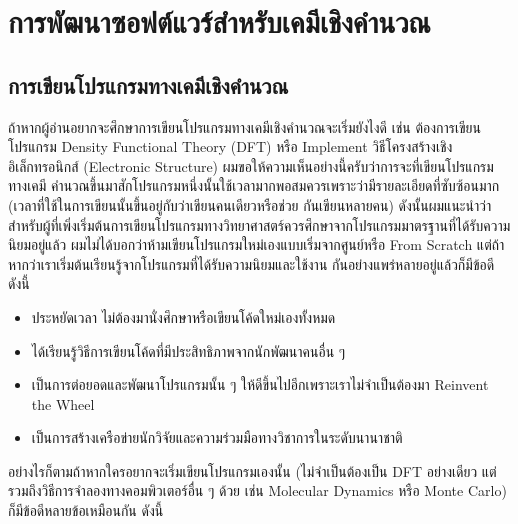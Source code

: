 

\chapter{การพัฒนาซอฟต์แวร์สำหรับเคมีเชิงคำนวณ}
\label{ch:software_dev}

\section{การเขียนโปรแกรมทางเคมีเชิงคำนวณ}

ถ้าหากผู้อ่านอยากจะศึกษาการเขียนโปรแกรมทางเคมีเชิงคำนวณจะเริ่มยังไงดี เช่น ต้องการเขียนโปรแกรม Density Functional Theory (DFT)
หรือ Implement วิธีโครงสร้างเชิงอิเล็กทรอนิกส์ (Electronic Structure) ผมขอให้ความเห็นอย่างนี้ครับว่าการจะที่เขียนโปรแกรมทางเคมี%
คำนวณขึ้นมาสักโปรแกรมหนึ่งนั้นใช้เวลามากพอสมควรเพราะว่ามีรายละเอียดที่ซับซ้อนมาก (เวลาที่ใช้ในการเขียนนั้นขึ้นอยู่กับว่าเขียนคนเดียวหรือช่วย%
กันเขียนหลายคน) ดังนั้นผมแนะนำว่าสำหรับผู้ที่เพิ่งเริ่มต้นการเขียนโปรแกรมทางวิทยาศาสตร์ควรศึกษาจากโปรแกรมมาตรฐานที่ได้รับความนิยมอยู่แล้ว
ผมไม่ได้บอกว่าห้ามเขียนโปรแกรมใหม่เองแบบเริ่มจากศูนย์หรือ From Scratch แต่ถ้าหากว่าเราเริ่มต้นเรียนรู้จากโปรแกรมที่ได้รับความนิยมและใช้งาน%
กันอย่างแพร่หลายอยู่แล้วก็มีข้อดีดังนี้

\begin{itemize}[topsep=0pt]
  \item ประหยัดเวลา ไม่ต้องมานั่งศึกษาหรือเขียนโค้ดใหม่เองทั้งหมด

  \item ได้เรียนรู้วิธีการเขียนโค้ดที่มีประสิทธิภาพจากนักพัฒนาคนอื่น ๆ

  \item เป็นการต่อยอดและพัฒนาโปรแกรมนั้น ๆ ให้ดีขึ้นไปอีกเพราะเราไม่จำเป็นต้องมา Reinvent the Wheel

  \item เป็นการสร้างเครือข่ายนักวิจัยและความร่วมมือทางวิชาการในระดับนานาชาติ
\end{itemize}

\noindent อย่างไรก็ตามถ้าหากใครอยากจะเริ่มเขียนโปรแกรมเองนั้น (ไม่จำเป็นต้องเป็น DFT อย่างเดียว แต่รวมถึงวิธีการจำลองทางคอมพิวเตอร์อื่น ๆ
ด้วย เช่น Molecular Dynamics หรือ Monte Carlo) ก็มีข้อดีหลายข้อเหมือนกัน ดังนี้

